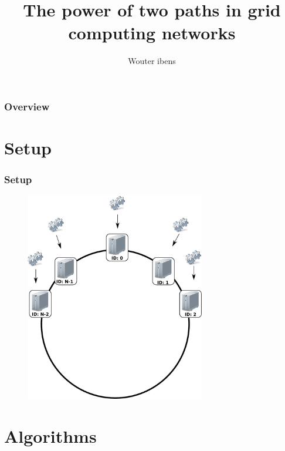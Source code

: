 \documentclass[compress]{beamer}
\title{The power of two paths in grid computing networks}
\author{Wouter ibens}
\begin{document}
\maketitle

\begin{frame}
\frametitle{Overview}
\tableofcontents
\end{frame}

\section{Setup}
\begin{frame}
\frametitle{Setup}
\begin{figure}[h!tb]
\centering
\includegraphics[width=0.7\textwidth,clip=true,trim=0px 225px 0px 0px]{../resources/drawing.pdf}
\end{figure}
\end{frame}

\section{Algorithms}
\end{document}
